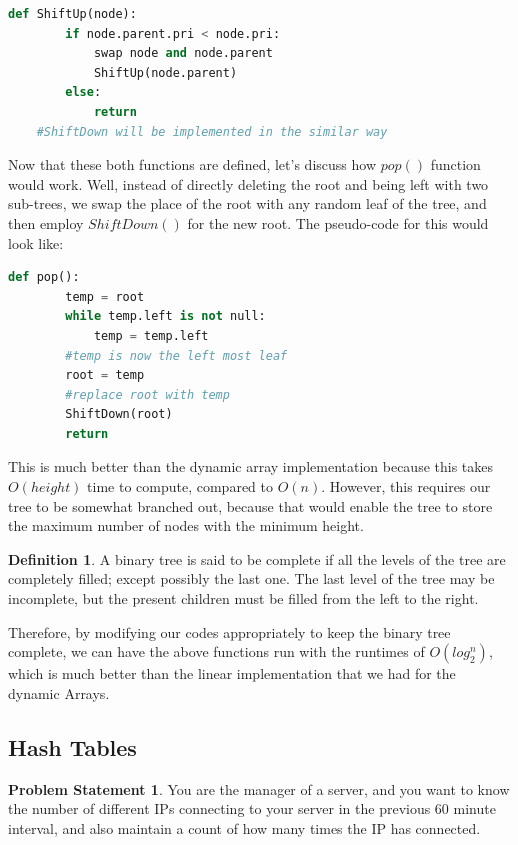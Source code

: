\documentclass{article}
\theoremstyle{definition}
\newtheorem*{definition}{Definition}
\theoremstyle{example}
\newtheorem*{example}{Problem Statement}
\begin{document}
\begin{lstlisting}[language = python, basicstyle = \Large]
    def ShiftUp(node):
        if node.parent.pri < node.pri:
            swap node and node.parent
            ShiftUp(node.parent)
        else:
            return
    #ShiftDown will be implemented in the similar way
\end{lstlisting}
\vspace{3mm}
\hspace{4mm}Now that these both functions are defined, let's discuss how $pop()$ function would work. Well, instead of directly deleting the root and being left with two sub-trees, we swap the place of the root with any random leaf of the tree, and then employ $ShiftDown()$ for the new root. The pseudo-code for this would look like:
\vspace{3mm}
\begin{lstlisting}[language = python, basicstyle = \Large]
    def pop():
        temp = root
        while temp.left is not null:
            temp = temp.left
        #temp is now the left most leaf
        root = temp
        #replace root with temp
        ShiftDown(root)
        return
\end{lstlisting}
\vspace{4mm}
\hspace{4mm} This is much better than the dynamic array implementation because this takes $O(height)$ time to compute, compared to $O(n)$. However, this requires our tree to be somewhat branched out, because that would enable the tree to store the maximum number of nodes with the minimum height.\par
\vspace{3mm}
\theoremstyle{definition}
\begin{definition}{}
    A binary tree is said to be complete if all the levels of the tree are completely filled; except possibly the last one. The last level of the tree may be incomplete, but the present children must be filled from the left to the right.
\end{definition}
\newpage
Therefore, by modifying our codes appropriately to keep the binary tree complete, we can have the above functions run with the runtimes of $O(log_2^n)$, which is much better than the linear implementation that we had for the dynamic Arrays.

\subsection{\Large Hash Tables}
\theoremstyle{example}
\begin{example}
    You are the manager of a server, and you want to know the number of different IPs connecting to your server in the previous 60 minute interval, and also maintain a count of how many times the IP has connected.
\end{example}
\end{document}
